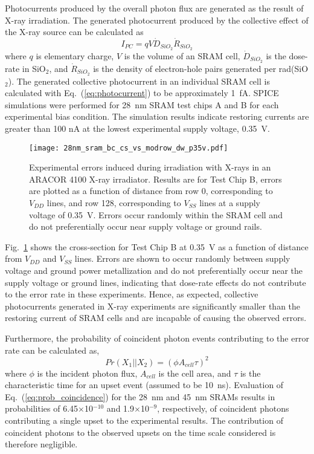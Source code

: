 Photocurrents produced by the overall photon flux are generated as the result of X-ray irradiation. 
The generated photocurrent produced by the collective effect of the X-ray source can be calculated as%
\begin{equation}
    \label{eq:photocurrent}
    I_{PC} = q V \dot{D}_{SiO_2} \dot{R}_{SiO_2}
\end{equation}
where $q$ is elementary charge, $V$ is the volume of an SRAM cell, $\dot{D}_{SiO_2}$ is the dose-rate in SiO$_2$, and $\dot{R}_{SiO_2}$ is the density of electron-hole pairs generated per rad(SiO$_2$). 
The generated collective photocurrent in an individual SRAM cell is calculated with Eq.~(\ref{eq:photocurrent}) to be approximately 1~fA. 
SPICE simulations were performed for 28~nm SRAM test chips A and B for each experimental bias condition. 
The simulation results indicate restoring currents are greater than 100 nA at the lowest experimental supply voltage, 0.35~V. 
\begin{figure}[tb]
    \begin{center}
        \texttt{[image: 28nm\_sram\_bc\_cs\_vs\_modrow\_dw\_p35v.pdf]}
    \end{center}
    \caption{Experimental errors induced during irradiation with X-rays in an ARACOR 4100 X-ray irradiator. Results are for Test Chip B, errors are plotted as a function of distance from row 0, corresponding to $V_{DD}$ lines, and row 128, corresponding to $V_{SS}$ lines at a supply voltage of 0.35~V. Errors occur randomly within the SRAM cell and do not preferentially occur near supply voltage or ground rails.}
    \label{fig:28nm_bc_cs_vs_modrow_dw_p35v}
\end{figure}
Fig.~\ref{fig:28nm_bc_cs_vs_modrow_dw_p35v} shows the cross-section for Test Chip B at 0.35~V as a function of distance from $V_{DD}$ and $V_{SS}$ lines.
Errors are shown to occur randomly between supply voltage and ground power metallization and do not preferentially occur near the supply voltage or ground lines, indicating that dose-rate effects do not contribute to the error rate in these experiments.
Hence, as expected, collective photocurrents generated in X-ray experiments are significantly smaller than the restoring current of SRAM cells and are incapable of causing the observed errors.

Furthermore, the probability of coincident photon events contributing to the error rate can be calculated as,
\begin{equation}
    \label{eq:prob_coincidence}
    Pr(X_1||X_2) = (\phi A_{cell} \tau)^2
\end{equation}
where $\phi$ is the incident photon flux, $A_{cell}$ is the cell area, and $\tau$ is the characteristic time for an upset event (assumed to be 10~ns). 
Evaluation of Eq.~(\ref{eq:prob_coincidence}) for the 28~nm and 45~nm SRAMs results in probabilities of 6.45$\times$10$^{-10}$ and 1.9$\times$10$^{-9}$, respectively, of coincident photons contributing a single upset to the experimental results. 
The contribution of coincident photons to the observed upsets on the time scale considered is therefore negligible.

